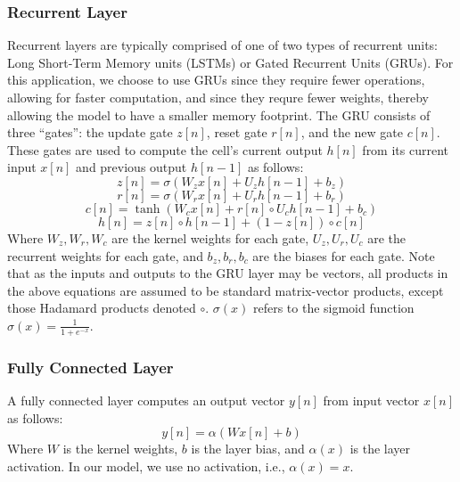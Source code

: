 \documentclass[twoside,a4paper]{article}
\begin{document}
\subsubsection{Recurrent Layer}
Recurrent layers are typically comprised of one of two types of
recurrent units: Long Short-Term Memory units (LSTMs) or Gated
Recurrent Units (GRUs). For this application, we choose to use
GRUs \cite{gru_original} since they require fewer operations,
allowing for faster computation, and since they requre fewer weights,
thereby allowing the model to have a smaller memory footprint. The
GRU consists of three ``gates'': the update gate $z[n]$, reset gate
$r[n]$, and the new gate $c[n]$. These gates are used to compute the
cell's current output $h[n]$ from its current input $x[n]$ and previous
output $h[n-1]$ as follows:
\begin{equation}
    z[n] = \sigma(W_z x[n] + U_z h[n-1] + b_z)
\end{equation}
\begin{equation}
    r[n] = \sigma(W_r x[n] + U_r h[n-1] + b_r)
\end{equation}
\begin{equation}
    c[n] = \tanh(W_c x[n] + r[n] \circ U_c h[n-1] + b_c)
\end{equation}
\begin{equation}
    h[n] = z[n] \circ h[n-1] + (1 - z[n]) \circ c[n]
\end{equation}
%
Where $W_z,W_r,W_c$ are the kernel weights for each gate,
$U_z,U_r,U_c$ are the recurrent weights for each gate, and
$b_z,b_r,b_c$ are the biases for each gate. Note that as the
inputs and outputs to the GRU layer may be vectors, all products
in the above equations are assumed to be standard matrix-vector
products, except those Hadamard products denoted $\circ$.
$\sigma(x)$ refers to the sigmoid function
$\sigma(x) = \frac{1}{1 + e^{-x}}$.
%
\subsubsection{Fully Connected Layer}
A fully connected layer computes an output vector $y[n]$ from
input vector $x[n]$ as follows:
\begin{equation}
    y[n] = \alpha(W x[n] + b)
\end{equation}
%
Where $W$ is the kernel weights, $b$ is the layer bias, and $\alpha(x)$
is the layer activation. In our model, we use no activation, i.e.,
$\alpha(x) = x$.
%
\end{document}
